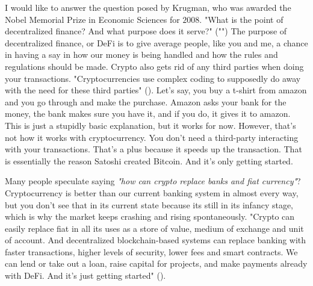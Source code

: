 \begin{essay}

  I would like to answer the question posed by Krugman, who was awarded the
  Nobel Memorial Prize in Economic Sciences for $2008$. "What is the point of
  decentralized finance? And what purpose does it serve?"
  ("\cite{krugman_opinion_nodate}") The purpose of decentralized finance, or
  DeFi is to give average people, like you and me, a chance in having a say in
  how our money is being handled and how the rules and regulations should be
  made. Crypto also gets rid of any third parties when doing your transactions.
  "Cryptocurrencies use complex coding to supposedly do away with the need for
  these third parties" (\cite{krugman_opinion_2022}). Let's say, you buy a
  t-shirt from amazon and you go through and make the purchase. Amazon asks
  your bank for the money, the bank makes sure you have it, and if you do, it
  gives it to amazon. This is just a stupidly basic explanation, but it works
  for now. However, that's not how it works with cryptocurrency. You don't need
  a third-party interacting with your transactions. That's a plus because it
  speeds up the transaction. That is essentially the reason Satoshi created
  Bitcoin. And it's only getting started.


  Many people speculate saying \textit{"how can crypto replace banks and fiat
  currency"}? Cryptocurrency is better than our current banking system in
  almost every way, but you don’t see that in its current state because its
  still in its infancy stage, which is why the market keeps crashing and rising
  spontaneously. "Crypto can easily replace fiat in all its uses as a store of
  value, medium of exchange and unit of account. And decentralized
  blockchain-based systems can replace banking with faster transactions, higher
  levels of security, lower fees and smart contracts. We can lend or take out a
  loan, raise capital for projects, and make payments already with DeFi. And
  it’s just getting started" (\cite{dwyer_will_nodate}).



\end{essay}
